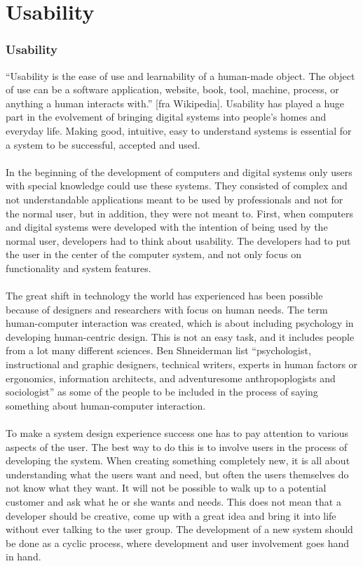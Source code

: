\chapter{Usability}
\subsection{Usability}
“Usability is the ease of use and learnability of a human-made object. The object of use can be a software application, website, book, tool, machine, process, or anything a human interacts with.” [fra Wikipedia]. Usability has played a huge part in the evolvement of bringing digital systems into people’s homes and everyday life. Making good, intuitive, easy to understand systems is essential for a system to be successful, accepted and used.\\ \\
In the beginning of the development of computers and digital systems only users with special knowledge could use these systems. They consisted of complex and not understandable applications meant to be used by professionals and not for the normal user, but in addition, they were not meant to. First, when computers and digital systems were developed with the intention of being used by the normal user, developers had to think about usability. The developers had to put the user in the center of the computer system, and not only focus on functionality and system features.\\ \\
The great shift in technology the world has experienced has been possible because of designers and researchers with focus on human needs. The term human-computer interaction was created, which is about including psychology in developing human-centric design. This is not an easy task, and it includes people from a lot many different sciences. Ben Shneiderman list “psychologist, instructional and graphic designers, technical writers, experts in human factors or ergonomics, information architects, and adventuresome anthropoplogists and sociologist” as some of the people to be included in the process of saying something about human-computer interaction. \\ \\  
To make a system design experience success one has to pay attention to various aspects of the user. The best way to do this is to involve users in the process of developing the system. When creating something completely new, it is all about understanding what the users want and need, but often the users themselves do not know what they want. It will not be possible to walk up to a potential customer and ask what he or she wants and needs. This does not mean that a developer should be creative, come up with a great idea and bring it into life without ever talking to the user group. The development of a new system should be done as a cyclic process, where development and user involvement goes hand in hand.   \\ \\
